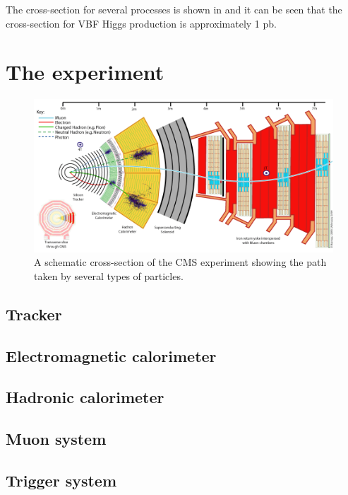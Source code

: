 The cross-section for several processes is shown in  and it can be seen that the cross-section for VBF Higgs production is approximately 1 pb. %


\section{The \CMS experiment}
\label{sec:CMSInDetail}

\begin{figure}
  \includegraphics[width=1.2\largefigwidth]{plots/detector/CMS_Slice.png}
  \caption{A schematic cross-section of the CMS experiment showing the path taken by several types of particles.}%
  \label{fig:cmsschematic}
\end{figure}

\subsection{Tracker}
\label{sec:tracker}

\subsection{Electromagnetic calorimeter}
\label{sec:ECAL}

\subsection{Hadronic calorimeter}
\label{sec:HCAL}

\subsection{Muon system}


\subsection{Trigger system}
\label{sec:triggers}

